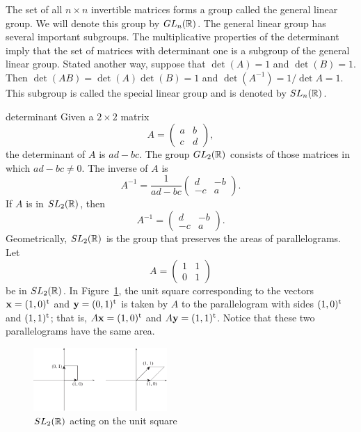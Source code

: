 The set of all $n \times n$  invertible matrices forms a group called
the {\bfi general linear group}.  We will
denote this group by $GL_n({\Bbb R})$.  The general linear group has
several important subgroups. The multiplicative properties of the
determinant imply that the set of matrices with determinant one is a
subgroup of the general linear group.  Stated another way, suppose
that $\det(A) =1$ and $\det(B) = 1$. Then $\det(AB) = \det(A) \det (B)
= 1$ and $\det(A^{-1}) = 1 / \det A = 1$. This subgroup is called the
{\bfi special linear group\/} and is
denoted by $SL_n({\Bbb R})$. 
 
 
\begin{example}{determinant}
Given a $2 \times 2$ matrix
\[
A =
\left(
\begin{array}{cc}
a & b \\
c & d
\end{array}
\right),
\]
the determinant of $A$ is \mbox{$ad-bc$}. The group $GL_2({\Bbb R})$
consists of those matrices in which $ad-bc \neq 0$. The inverse of $A$
is 
\[
A^{-1} =
\frac{1}{ad-bc}
\left(
\begin{array}{cc}
d & -b \\
-c & a
\end{array}
\right).
\]
If $A$ is in $SL_2({\Bbb R})$, then
\[
A^{-1} =
\left(
\begin{array}{cc}
d & -b \\
-c & a
\end{array}
\right).
\]
Geometrically, $SL_2({\Bbb R})$ is the group that preserves the areas
of parallelograms.  Let 
\[
A =
\left(
\begin{array}{cc}
1 & 1 \\
0 & 1
\end{array}
\right)
\]
be in $SL_2({\Bbb R})$. In Figure~\ref{SL2}, the unit square
corresponding to the vectors ${\bold x} = (1,0)^{\rm t}$ and ${\bold
y} =  (0,1)^{\rm t}$ is taken  by $A$ to the parallelogram with sides
$(1,0)^{\rm t}$ and $(1, 1)^{\rm t}$; that is, $A {\bold x} =
(1,0)^{\rm t}$ and $A {\bold y} = (1, 1)^{\rm t}$. Notice that these
two parallelograms have the same area.   
\end{example}
 
 
\begin{figure}[htb]
\begin{center}
\centerline {
\includegraphics[width=2in]{SL2}
}
\end{center}
\caption{$SL_2({\Bbb R})$ acting on the unit square}
\label{SL2}
\end{figure}
 
